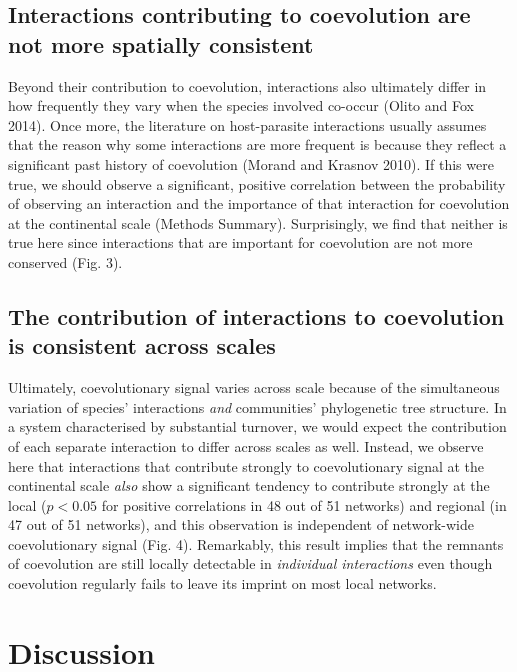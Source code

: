 \documentclass[12pt]{article}
\begin{document}
\subsection{Interactions contributing to coevolution are not more
spatially
consistent}\label{interactions-contributing-to-coevolution-are-not-more-spatially-consistent}

Beyond their contribution to coevolution, interactions also ultimately
differ in how frequently they vary when the species involved co-occur
(Olito and Fox 2014). Once more, the literature on host-parasite
interactions usually assumes that the reason why some interactions are
more frequent is because they reflect a significant past history of
coevolution (Morand and Krasnov 2010). If this were true, we should
observe a significant, positive correlation between the probability of
observing an interaction and the importance of that interaction for
coevolution at the continental scale (Methods Summary). Surprisingly, we
find that neither is true here since interactions that are important for
coevolution are not more conserved (Fig. 3).

\subsection{The contribution of interactions to coevolution is
consistent across
scales}\label{the-contribution-of-interactions-to-coevolution-is-consistent-across-scales}

Ultimately, coevolutionary signal varies across scale because of the
simultaneous variation of species' interactions \emph{and} communities'
phylogenetic tree structure. In a system characterised by substantial
turnover, we would expect the contribution of each separate interaction
to differ across scales as well. Instead, we observe here that
interactions that contribute strongly to coevolutionary signal at the
continental scale \emph{also} show a significant tendency to contribute
strongly at the local (\(p<0.05\) for positive correlations in 48 out of
51 networks) and regional (in 47 out of 51 networks), and this
observation is independent of network-wide coevolutionary signal (Fig.
4). Remarkably, this result implies that the remnants of coevolution are
still locally detectable in \emph{individual interactions} even though
coevolution regularly fails to leave its imprint on most local networks.

\section{Discussion}\label{discussion}
\end{document}

